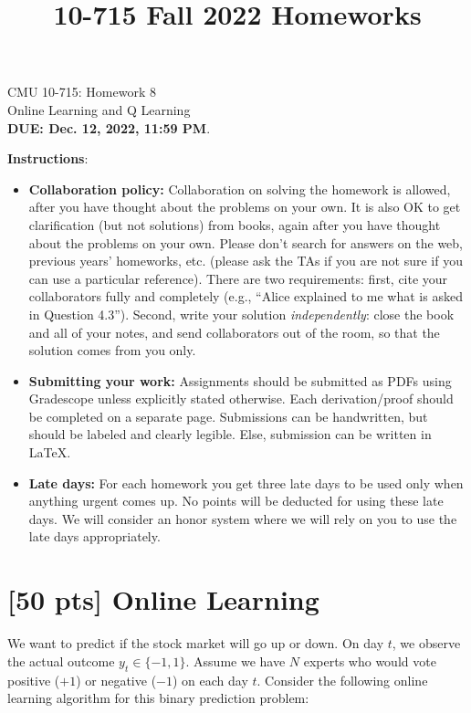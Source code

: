 \documentclass{article}
\title{10-715 Fall 2022 Homeworks}
\begin{document}
\begin{center}
{\Large CMU 10-715: Homework 8}\\
Online Learning and Q Learning \\
{\bf DUE: Dec. 12, 2022, 11:59 PM}.\\
\end{center}


\textbf{\large Instructions}:
\begin{itemize}
    \item \textbf{Collaboration policy:} Collaboration on solving the homework is allowed, after you have thought about the problems on your own. It is also OK to get clarification (but not solutions) from books, again after you have thought about the problems on your own. Please don’t search for answers on the web, previous years’ homeworks, etc. (please ask the TAs if you are not sure if you can use a particular reference). There are two requirements: first, cite your collaborators fully and completely (e.g., ``Alice explained to me what is asked in Question 4.3''). Second, write your solution \emph{independently}: close the book and all of your notes, and send collaborators out of the room, so that the solution comes from you only. 
    \item \textbf{Submitting your work:} Assignments should be submitted as PDFs using Gradescope unless explicitly stated otherwise. Each derivation/proof should be completed on a separate page. Submissions can be handwritten, but should be labeled and clearly legible. Else, submission can be written in LaTeX.
    
    \item \textbf{Late days:} For each homework you get three late days to be used only when anything urgent comes up. No points will be deducted for using these late days. We will consider an honor system where we will rely on you to use the late days appropriately.
    

\end{itemize}

\newpage 
\section{[50 pts] Online Learning} 

We want to predict if the stock market will go up or down. On day $t$, we observe the actual outcome $y_t\in \{ -1, 1\}$. Assume we have $N$ experts who would vote positive ($+1$) or negative ($-1$) on each day $t$. 
Consider the following online learning algorithm for this binary prediction problem:
\vspace{5mm}
\end{document}

